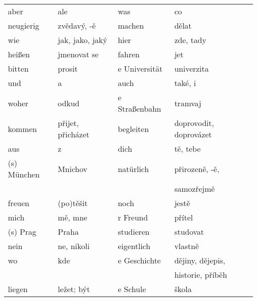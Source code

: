   \begin{widetext}
    \centering
    \begin{tabular}{llll}
      \hline
      aber        & ale               & was               & co                                \\
      neugierig   & zvědavý, -ě       & machen            & dělat                             \\
      wie         & jak, jako, jaký   & hier              & zde, tady                         \\
      hei{\ss}en  & jmenovat se       & fahren            & jet                               \\
      bitten      & prosit            & e Universit{\"a}t & univerzita                        \\
      und         & a                 & auch              & také, i                           \\
      woher       & odkud             & e Straßenbahn     & tramvaj                           \\
      kommen      & přijet, přicházet & begleiten         & doprovodit, doprovázet            \\
      aus         & z                 & dich              & tě, tebe                          \\
      (s) M{\"u}nchen  & Mnichov      & nat{\"u}rlich     & přirozeně, -ě,                    \\
                  &                   &                   & samozřejmě                        \\
      freuen      & (po)těšit         & noch              & jestě                             \\
      mich        & mě, mne           & r Freund          & přítel                            \\
      (s) Prag    & Praha             & studieren         & studovat                          \\
      nein        & ne, nikoli        & eigentlich        & vlastně                           \\
      wo          & kde               & e Geschichte      & dějiny, dějepis,                  \\
                  &                   &                   & historie, příběh                  \\
      liegen      & ležet; být        & e Schule          & škola                             \\

\end{tabular}
\end{widetext}
